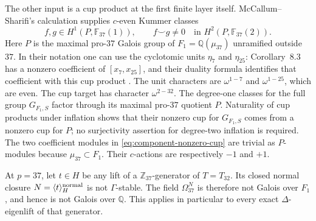 The other input is a cup product at the first finite layer itself.
McCallum--Sharifi's calculation supplies $c$-even Kummer classes
\begin{equation}\label{eq:component-nonzero-cup}
 f,g\in H^1(P,\mathbb F_{37}(1)),\qquad
 f\smile g\ne0\quad\text{in }H^2(P,\mathbb F_{37}(2)).
\end{equation}
Here $P$ is the maximal pro-$37$ Galois group of
$F_1=\mathbb Q(\mu_{37})$ unramified outside $37$.
In their notation one can use the cyclotomic units $\eta_7$
and $\eta_{25}$: Corollary~8.3 has a nonzero coefficient of
$[x_7,x_{25}]$, and their duality formula identifies that
coefficient with this cup product
\cite[Theorem~7.5, p.~20; Corollary~8.3, p.~23]{MS}.
The unit characters are $\omega^{1-7}$ and $\omega^{1-25}$,
which are even.  The cup target has character $\omega^{2-32}$.
The degree-one classes for the full group $G_{F_1,S}$ factor
through its maximal pro-$37$ quotient $P$.  Naturality of cup
products under inflation shows that their nonzero cup for
$G_{F_1,S}$ comes from a nonzero cup for $P$; no surjectivity
assertion for degree-two inflation is required.
The two coefficient modules in \eqref{eq:component-nonzero-cup}
are trivial as $P$-modules because $\mu_{37}\subset F_1$.
Their $c$-actions are respectively $-1$ and $+1$.

\begin{theorem}\label{thm:component-no-galois-p37}
At $p=37$, let $t\in H$ be any lift of a
$\mathbb Z_{37}$-generator of $T=T_{32}$.  Its closed normal
closure $N=\langle t\rangle_H^{\rm normal}$ is not
$\Gamma$-stable.  The field $\Omega_{37}^N$ is therefore not
Galois over $F_1$, and hence is not Galois over $\mathbb Q$.
This applies in particular to every exact $\Delta$-eigenlift of
that generator.
\end{theorem}

